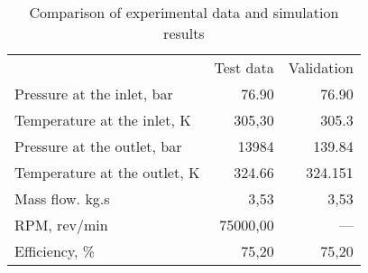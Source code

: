 \begin{table}
\label{tab:Comparison}
\caption{Comparison of experimental data and simulation results}
\begin{center}
\begin{tabulary}{0.9\textwidth}{LRR}

	&	Test data \cite{Rinaldi_2013}	&	Validation	\\
Pressure at the inlet, bar	&	76.90	&	76.90	\\
Temperature at the inlet, K	&	305,30	&	305.3	\\
Pressure at the outlet, bar	&	13984	&	139.84	\\
Temperature at the outlet, K	&	324.66	&	324.151	\\
Mass flow. kg.s	&	3,53	&	3,53	\\
RPM, rev/min	&	75000,00	&	—	\\
Efficiency, \%	&	75,20	&	75,20	\\

\end{tabulary}
\end{center}
\end{table}
